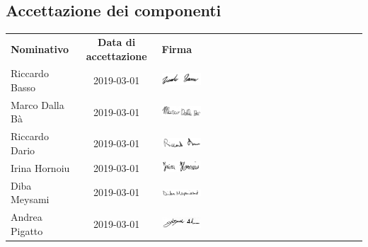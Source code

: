 \subsection{Accettazione dei componenti}
\begin{table}[H]
	\centering\renewcommand{\arraystretch}{1.5}
	
	\begin{tabular}{l c M{0.35\textwidth}}
		
		
		\rowcolorhead 
		{ \textbf{Nominativo}} &
		{ \textbf{Data di accettazione}} &
		{ \textbf{Firma}}  \\
		
		\rowcolorlight
		Riccardo Basso & 2019-03-01 &   	\includegraphics[width=0.2\textwidth]{res/images/firme/RiccardoB.png}\\  
		\rowcolordark
		Marco Dalla Bà & 2019-03-01 &     	\includegraphics[width=0.2\textwidth]{res/images/firme/MarcoD.png}\\  
		\rowcolorlight
		Riccardo Dario & 2019-03-01 &   	\includegraphics[width=0.2\textwidth]{res/images/firme/RiccardoD.png}\\  
		\rowcolordark
		Irina Hornoiu & 2019-03-01 &   	\includegraphics[width=0.2\textwidth]{res/images/firme/IrinaH.png}\\  
		\rowcolorlight
		Diba Meysami & 2019-03-01 &   	\includegraphics[width=0.2\textwidth]{res/images/firme/DibaM.png}\\ 
		\rowcolordark
		Andrea Pigatto & 2019-03-01 &   	\includegraphics[width=0.2\textwidth]{res/images/firme/AndreaP.png}\\   
	\end{tabular}
\end{table}

